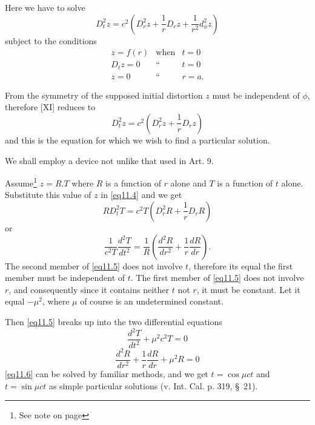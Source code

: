 \documentclass[oneside,12pt]{book}
\begin{document}
Here we have to solve 
\begin{equation*}
    D_t^2z=c^2\left(D_r^2z+\frac{1}{r}D_rz+\frac{1}{r^2}d_\phi^2z \right)
    \tag{[XI] Art. 1}
\end{equation*}
subject to the conditions 
\begin{eqnarray}
    z=f(r) & \text{when} & t=0 \label{eq11.1} \\ 
    D_tz=0 & \text{``} & t=0 \label{eq11.2} \\ 
    z=0 & \text{``} & r=a. \label{eq11.3} 
\end{eqnarray} \par 

From the symmetry of the supposed initial distortion $z$ must be independent of $\phi$, therefore [XI] reduces to 
\begin{equation}
    D_t^2z=c^2\left(D_r^2z+\frac{1}{r}D_rz\right) \label{eq11.4}
\end{equation}
and this is the equation for which we wish to find a particular solution. \par 

We shall employ a device not unlike that used in Art. 9. \par 

Assume\footnote{See note on page \pageref{note2}} $z=R.T$ where $R$ is a function of $r$ alone and $T$ is a function of $t$ alone. Substitute this value of $z$ in \eqref{eq11.4} and we get 
\begin{equation*}
    RD_t^2T=c^2T\left(D_r^2R+\frac{1}{r}D_rR\right)
\end{equation*}
or 
\begin{equation}
    \frac{1}{c^2T}\frac{d^2T}{dt^2}=\frac{1}{R}\left(\frac{d^2R}{dr^2}+\frac{1}{r}\frac{dR}{dr}\right). \label{eq11.5}
\end{equation}
The second member of \eqref{eq11.5} does not involve $t$, therefore its equal the first member must be independent of $t$. The first member of \eqref{eq11.5} does not involve $r$, and consequently since it contains neither $t$ not $r$, it must be constant. Let it equal $-\mu^2$, where $\mu$ of course is an undetermined constant. \par 

Then \eqref{eq11.5} breaks up into the two differential equations 
\begin{equation}
    \frac{d^2T}{dt^2}+\mu^2c^2T=0 \label{eq11.6}
\end{equation}
\begin{equation}
    \frac{d^2R}{dr^2}+\frac{1}{r}\frac{dR}{dr}+\mu^2R=0 \label{eq11.7}
\end{equation}
\eqref{eq11.6} can be solved by familiar methods, and we get $t=\cos\mu ct$ and $t=\sin\mu ct$ as simple particular solutions (v. Int. Cal. p. 319, \S\, 21). \par 
\end{document}
